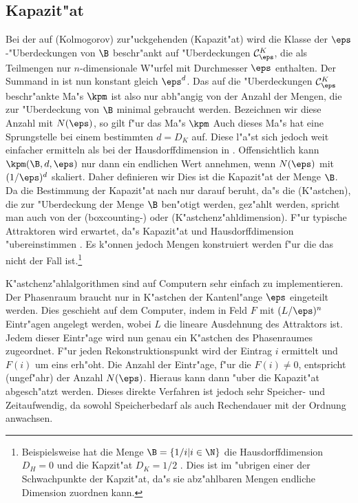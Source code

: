\subsection{Kapazit"at}
\label{chapcapacity}
Bei der auf \autor(Kolmogorov) zur"uckgehenden \begriff(Kapazit"at) wird die Klasse der
$\eps$-"Uberdeckungen von $\B$ beschr"ankt auf "Uberdeckungen $\mathcal C^K_\eps$, die als Teilmengen nur
$n$-dimensionale W"urfel mit Durchmesser $\eps$ enthalten. Der Summand in
 ist nun konstant gleich $\eps^d$. Das auf die "Uberdeckungen $\mathcal C^K_\eps$
beschr"ankte Ma"s $\kpm$ ist also nur abh"angig von der Anzahl der Mengen, die zur "Uberdeckung
von $\B$ minimal gebraucht werden. Bezeichnen wir diese Anzahl mit $N(\eps)$, so gilt f"ur das
Ma"s $\kpm$
Auch dieses Ma"s hat eine Sprungstelle bei einem bestimmten $d=D_K$ auf. Diese l"a"st sich 
jedoch weit einfacher ermitteln als bei der Hausdorffdimension in
. Offensichtlich kann $\kpm(\B,d,\eps)$ nur dann ein endlichen Wert
annehmen, wenn $N(\eps)$ mit $(1/\eps)^d$ skaliert. Daher definieren wir
Dies ist die Kapazit"at der Menge $\B$. Da die Bestimmung der Kapazit"at nach
 nur darauf beruht, da"s die \naja(K"astchen), die zur "Uberdeckung der
Menge $\B$ ben"otigt werden, gez"ahlt werden, spricht man auch von der
\begriff(boxcounting-) oder \begriff(K"astchenz"ahldimension). F"ur typische Attraktoren
wird erwartet, da"s Kapazit"at und Hausdorffdimension "ubereinstimmen
\cite{farmer-ott-yorke}. Es k"onnen jedoch Mengen konstruiert werden f"ur die das nicht der 
Fall ist.\footnote{Beispielsweise hat die Menge $\B=\{1/i\vert i\in\N\}$ die 
Hausdorffdimension $D_H=0$ und die Kapzit"at $D_K=1/2$ \cite{Leven89}. Dies ist im "ubrigen einer der
Schwachpunkte der Kapzit"at, da"s sie abz"ahlbaren Mengen endliche Dimension zuordnen kann.}

K"astchenz"ahlalgorithmen sind auf Computern sehr einfach zu implementieren. Der
Phasenraum braucht nur in K"astchen der Kantenl"ange $\eps$ eingeteilt werden\footnotemark. Dies
geschieht auf dem Computer, indem in Feld $F$ mit $(L/\eps)^n$ Eintr"agen angelegt
werden, wobei $L$ die lineare Ausdehnung des Attraktors ist. Jedem dieser Eintr"age wird
nun genau ein K"astchen des Phasenraumes 
zugeordnet. F"ur jeden Rekonstruktionspunkt wird der Eintrag $i$ ermittelt und $F(i)$ um
eins erh"oht. Die Anzahl der Eintr"age, f"ur die $F(i)\neq 0$, entspricht (ungef"ahr) der
Anzahl $N(\eps)$. Hieraus kann dann "uber  die Kapazit"at abgesch"atzt
werden. Dieses direkte Verfahren ist jedoch sehr Speicher- und Zeitaufwendig, da 
sowohl Speicherbedarf als auch Rechendauer mit der Ordnung  anwachsen.


